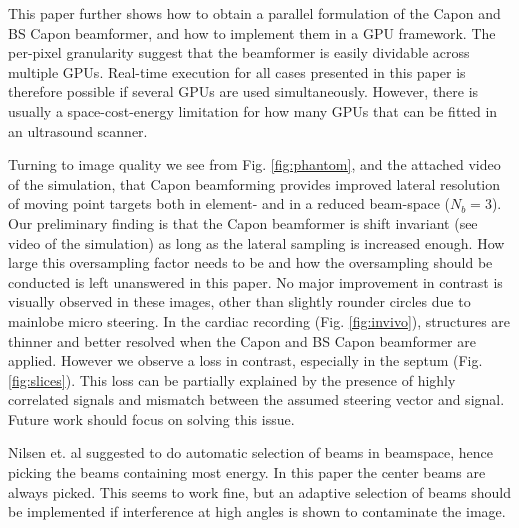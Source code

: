 \documentclass[journal]{IEEEtran}
\begin{document}
This paper further shows how to obtain a parallel formulation of the Capon and BS Capon beamformer, and how to implement them in a GPU framework. The per-pixel granularity suggest that the beamformer is easily dividable across multiple GPUs. Real-time execution for all cases presented in this paper is therefore possible if several GPUs are used simultaneously. However, there is usually a space-cost-energy limitation for how many GPUs that can be fitted in an ultrasound scanner.
 
Turning to image quality we see from Fig. \ref{fig:phantom}, and the attached video of the simulation, that Capon beamforming provides improved lateral resolution of moving point targets both in element- and in a reduced beam-space ($N_b=3$). Our preliminary finding is that the Capon beamformer is shift invariant (see video of the simulation) as long as the lateral sampling is increased enough. How large this oversampling factor needs to be and how the oversampling should be conducted is left unanswered in this paper. No major improvement in contrast is visually observed in these images, other than slightly rounder circles due to mainlobe micro steering. In the cardiac recording (Fig. \ref{fig:invivo}), structures are thinner and better resolved when the Capon and BS Capon beamformer are applied. However we observe a loss in contrast, especially in the septum (Fig. \ref{fig:slices}). This loss can be partially explained by the presence of highly correlated signals and mismatch between the assumed steering vector and signal. Future work should focus on solving this issue.

Nilsen et. al suggested to do automatic selection of beams in beamspace, hence picking the beams containing most energy. In this paper the center beams are always picked. This seems to work fine, but an adaptive selection of beams should be implemented if interference at high angles is shown to contaminate the image.


\end{document}

